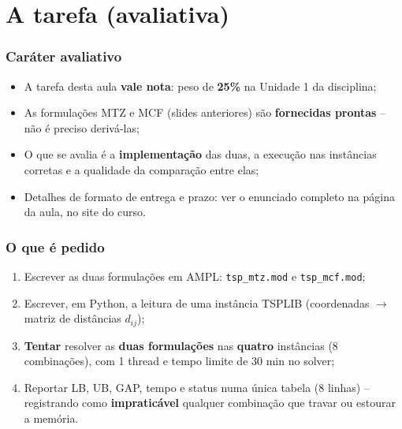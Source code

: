 \documentclass[fleqn]{beamer}
\begin{document}
\section{A tarefa (avaliativa)}

\begin{frame}
	\frametitle{Caráter avaliativo}
	\begin{itemize}
		\item A tarefa desta aula \textbf{vale nota}: peso de
			\textbf{25\%} na Unidade 1 da disciplina;
		\item As formulações MTZ e MCF (slides anteriores) são
			\textbf{fornecidas prontas} -- não é preciso derivá-las;
		\item O que se avalia é a \textbf{implementação} das duas, a
			execução nas instâncias corretas e a qualidade da comparação
			entre elas;
		\item Detalhes de formato de entrega e prazo: ver o enunciado
			completo na página da aula, no site do curso.
	\end{itemize}
\end{frame}

\begin{frame}
	\frametitle{O que é pedido}
	\begin{enumerate}
		\item Escrever as duas formulações em AMPL:
			\texttt{tsp\_mtz.mod} e \texttt{tsp\_mcf.mod};
		\item Escrever, em Python, a leitura de uma instância TSPLIB
			(coordenadas $\to$ matriz de distâncias $d_{ij}$);
		\item \textbf{Tentar} resolver as \textbf{duas formulações} nas
			\textbf{quatro} instâncias (8 combinações), com 1 thread e
			tempo limite de 30 min no solver;
		\item Reportar LB, UB, GAP, tempo e status numa única tabela (8
			linhas) -- registrando como \textbf{impraticável} qualquer
			combinação que travar ou estourar a memória.
	\end{enumerate}
\end{frame}
\end{document}
